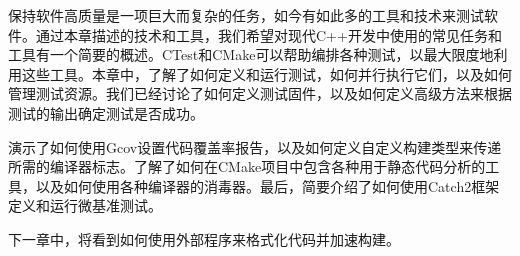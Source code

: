 保持软件高质量是一项巨大而复杂的任务，如今有如此多的工具和技术来测试软件。通过本章描述的技术和工具，我们希望对现代C++开发中使用的常见任务和工具有一个简要的概述。CTest和CMake可以帮助编排各种测试，以最大限度地利用这些工具。本章中，了解了如何定义和运行测试，如何并行执行它们，以及如何管理测试资源。我们已经讨论了如何定义测试固件，以及如何定义高级方法来根据测试的输出确定测试是否成功。

演示了如何使用Gcov设置代码覆盖率报告，以及如何定义自定义构建类型来传递所需的编译器标志。了解了如何在CMake项目中包含各种用于静态代码分析的工具，以及如何使用各种编译器的消毒器。最后，简要介绍了如何使用Catch2框架定义和运行微基准测试。

下一章中，将看到如何使用外部程序来格式化代码并加速构建。
